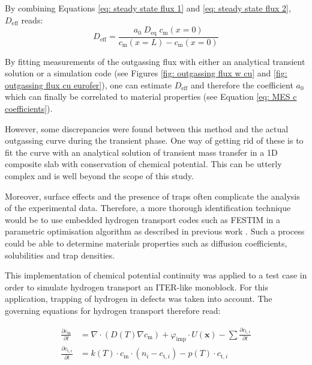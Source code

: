 By combining Equations \ref{eq: steady state flux 1} and \ref{eq: steady state flux 2}, $D_\mathrm{eff}$ reads:
\begin{equation}
    D_\mathrm{eff} = \frac{a_0 \; D_\mathrm{eq} \; c_\mathrm{m}(x=0) }{c_\mathrm{m}(x=L) - c_\mathrm{m}(x=0)}
\end{equation}

By fitting measurements of the outgassing flux with either an analytical transient solution or a simulation code (see Figures \ref{fig: outgassing flux w cu} and \ref{fig: outgassing flux cu eurofer}), one can estimate $D_\mathrm{eff}$ and therefore the coefficient $a_0$ which can finally be correlated to material properties (see Equation \ref{eq: MES c coefficients}).

However, some discrepancies were found between this method and the actual outgassing curve during the transient phase.
One way of getting rid of these is to fit the curve with an analytical solution of transient mass transfer in a 1D composite slab with conservation of chemical potential.
This can be utterly complex and is well beyond the scope of this study.

Moreover, surface effects and the presence of traps often complicate the analysis of the experimental data.
Therefore, a more thorough identification technique would be to use embedded hydrogen transport codes such as FESTIM in a parametric optimisation algorithm as described in previous work .
Such a process could be able to determine materials properties such as diffusion coefficients, solubilities and trap densities.

This implementation of chemical potential continuity was applied to a test case in order to simulate hydrogen transport an ITER-like monoblock.
For this application, trapping of hydrogen in defects was taken into account.
The governing equations for hydrogen transport therefore read:

\begin{subequations}
    \begin{align}
        \frac{\partial c_\mathrm{m}}{\partial t} &=\nabla \cdot\left(D(T) \nabla c_\mathrm{m}\right) + \varphi_\mathrm{imp} \cdot U(\textbf{x}) -\sum \frac{\partial c_{\mathrm{t}, i}}{\partial t} \\
        \frac{\partial c_{\mathrm{t}, i}}{\partial t} &=k(T) \cdot c_\mathrm{m} \cdot\left(n_{i}-c_{\mathrm{t}, i}\right)-p(T) \cdot c_{\mathrm{t}, i}
    \end{align}
\end{subequations}

